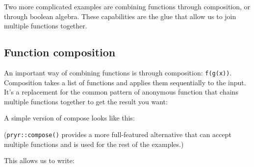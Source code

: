 Two more complicated examples are combining functions through
composition, or through boolean algebra. These capabilities are the glue
that allow us to join multiple functions together.

\subsection{Function composition}

An important way of combining functions is through composition:
\texttt{f(g(x))}. Composition takes a list of functions and applies them
sequentially to the input. It's a replacement for the common pattern of
anonymous function that chains multiple functions together to get the
result you want:  

\begin{Shaded}
\begin{Highlighting}[]
\NormalTok{(}
\end{Highlighting}
\end{Shaded}

A simple version of compose looks like this:

\begin{Shaded}
\begin{Highlighting}[]
\StringTok{ }
  \NormalTok{(}
\NormalTok{\}}
\end{Highlighting}
\end{Shaded}

(\texttt{pryr::compose()} provides a more full-featured alternative that
can accept multiple functions and is used for the rest of the examples.)

This allows us to write:

\begin{Shaded}
\begin{Highlighting}[]
\end{Highlighting}
\end{Shaded}

